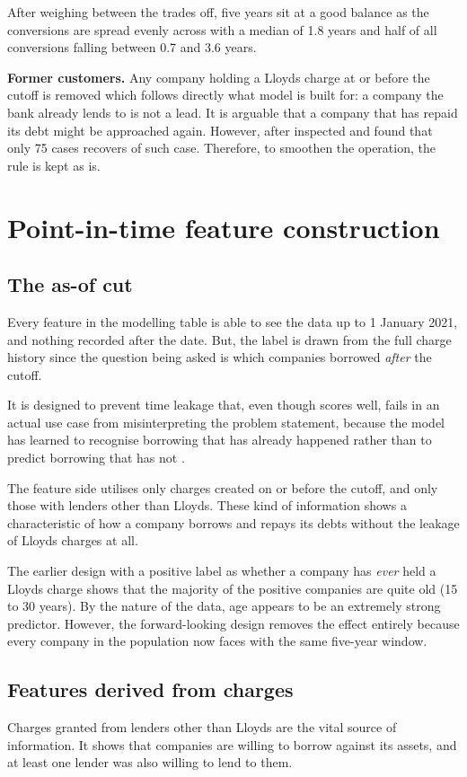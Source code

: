 \documentclass[ %
                    author={Natchalin Iwsakul \\ Inkaphol Siriwongwattana \\ Tanaphan Kummaraphat \\ Patorn Srisupap},
                supervisor={Fernando Moreno-Pino},
                    degree={MSc},
                     title={Propensity Modelling for SME Commercial Lending Using Open Public Data},
                  subtitle={Companies House filings and GDELT media coverage as predictors of first-time borrowing},
                      type={},
                      year={2026}]{dissertation}
\begin{document}
After weighing between the trades off, five years sit at a good balance as the conversions are spread evenly across with a median of 1.8 years and half of all conversions falling between 0.7 and 3.6 years. 

\textbf{Former customers.} Any company holding a Lloyds charge at or before the cutoff is removed which follows directly what model is built for: a company the bank already lends to is not a lead. It is arguable that a company that has repaid its debt might be approached again. However, after inspected and found that only 75 cases recovers of such case. Therefore, to smoothen the operation, the rule is kept as is.

\section{Point-in-time feature construction}   \label{sec:features}
  \subsection{The as-of cut}
  Every feature in the modelling table is able to see the data up to 1 January 2021, and nothing recorded after the date. But, the label is drawn from the full charge history since the question being asked is which companies borrowed \textit{after} the cutoff.

  It is designed to prevent time leakage that, even though scores well, fails in an actual use case from misinterpreting the problem statement, because the model has learned to recognise borrowing that has already happened rather than to predict borrowing that has not \cite{kaufman2012leakage}. 

  The feature side utilises only charges created on or before the cutoff, and only those with lenders other than Lloyds. These kind of information shows a characteristic of how a company borrows and repays its debts without the leakage of Lloyds charges at all.

  The earlier design with a positive label as whether a company has \textit{ever} held a Lloyds charge shows that the majority of the positive companies are quite old (15 to 30 years). By the nature of the data, age appears to be an extremely strong predictor. However, the forward-looking design removes the effect entirely because every company in the population now faces with the same five-year window.

  \subsection{Features derived from charges}
  Charges granted from lenders other than Lloyds are the vital source of information. It shows that companies are willing to borrow against its assets, and at least one lender was also willing to lend to them.
\end{document}
